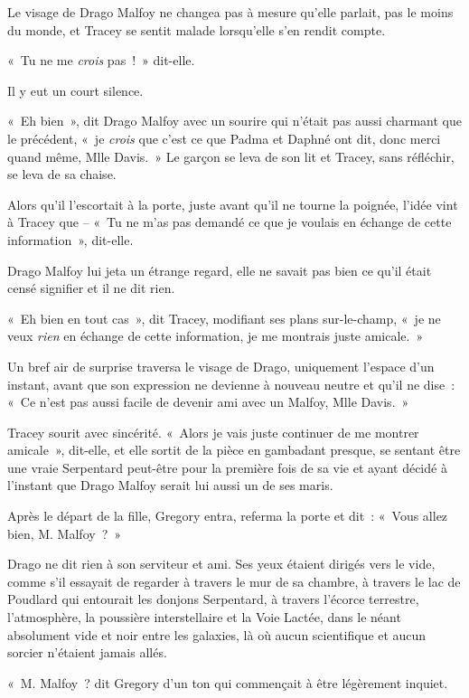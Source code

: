 Le visage de Drago Malfoy ne changea pas à mesure qu'elle parlait, pas le moins du monde, et Tracey se sentit malade lorsqu'elle s'en rendit compte.

«~Tu ne me \emph{crois} pas~!~» dit-elle.

Il y eut un court silence.

«~Eh bien~», dit Drago Malfoy avec un sourire qui n'était pas aussi charmant que le précédent, «~je \emph{crois} que c'est ce que Padma et Daphné ont dit, donc merci quand même, Mlle Davis.~» Le garçon se leva de son lit et Tracey, sans réfléchir, se leva de sa chaise.

Alors qu'il l'escortait à la porte, juste avant qu'il ne tourne la poignée, l'idée vint à Tracey que -- «~Tu ne m'as pas demandé ce que je voulais en échange de cette information~», dit-elle.

Drago Malfoy lui jeta un étrange regard, elle ne savait pas bien ce qu'il était censé signifier et il ne dit rien.

«~Eh bien en tout cas~», dit Tracey, modifiant ses plans sur-le-champ, «~je ne veux \emph{rien} en échange de cette information, je me montrais juste amicale.~»

Un bref air de surprise traversa le visage de Drago, uniquement l'espace d'un instant, avant que son expression ne devienne à nouveau neutre et qu'il ne dise~: «~Ce n'est pas aussi facile de devenir ami avec un Malfoy, Mlle Davis.~»

Tracey sourit avec sincérité. «~Alors je vais juste continuer de me montrer amicale~», dit-elle, et elle sortit de la pièce en gambadant presque, se sentant être une vraie Serpentard peut-être pour la première fois de sa vie et ayant décidé à l'instant que Drago Malfoy serait lui aussi un de ses maris.

\later

Après le départ de la fille, Gregory entra, referma la porte et dit~: «~Vous allez bien, M. Malfoy~?~»

Drago ne dit rien à son serviteur et ami. Ses yeux étaient dirigés vers le vide, comme s'il essayait de regarder à travers le mur de sa chambre, à travers le lac de Poudlard qui entourait les donjons Serpentard, à travers l'écorce terrestre, l'atmosphère, la poussière interstellaire et la Voie Lactée, dans le néant absolument vide et noir entre les galaxies, là où aucun scientifique et aucun sorcier n'étaient jamais allés.

«~M. Malfoy~? dit Gregory d'un ton qui commençait à être légèrement inquiet.

